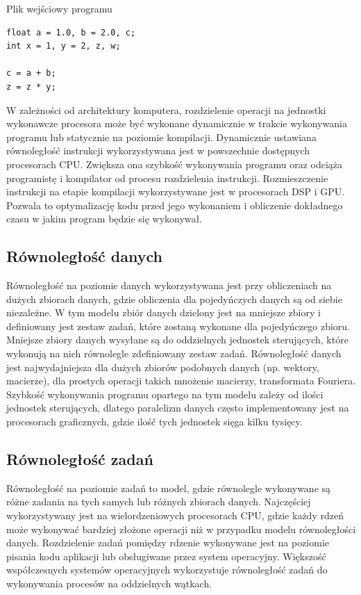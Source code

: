 \begin{program}
\caption{Plik wejściowy programu}
\begin{lstlisting}
float a = 1.0, b = 2.0, c;
int x = 1, y = 2, z, w;

c = a + b;
z = z * y;
\end{lstlisting}
\end{program}

W zależności od architektury komputera, rozdzielenie operacji na jednostki wykonawcze procesora może być wykonane dynamicznie w trakcie wykonywania programu lub statycznie na poziomie kompilacji. Dynamicznie ustawiana równoległość instrukcji wykorzystywana jest w powszechnie dostępnych procesorach CPU. Zwiększa ona szybkość wykonywania programu oraz odciąża programistę i kompilator od procesu rozdzielenia instrukcji. Rozmieszczenie instrukcji na etapie kompilacji wykorzystywane jest w procesorach DSP i GPU. Pozwala to optymalizację kodu przed jego wykonaniem i obliczenie dokładnego czasu w jakim program będzie się wykonywał.  

\subsection{Równoległość danych}\label{sec:datap}

Równoległość na poziomie danych wykorzystywana jest przy obliczeniach na dużych zbiorach danych, gdzie obliczenia dla pojedyńczych danych są od siebie niezależne. W tym modelu zbiór danych dzielony jest na mniejsze zbiory i definiowany jest zestaw zadań, które zostaną wykonane dla pojedyńczego zbioru. Mniejsze zbiory danych wysyłane są do oddzielnych jednostek sterujących, które wykonują na nich równolegle zdefiniowany zestaw zadań. Równoległość danych jest najwydajniejsza dla dużych zbiorów podobnych danych (np. wektory, macierze), dla prostych operacji takich mnożenie macierzy, transformata Fouriera. Szybkość wykonywania programu opartego na tym modelu zależy od ilości jednostek sterujących, dlatego paralelizm danych często implementowany jest na procesorach graficznych, gdzie ilość tych jednostek sięga kilku tysięcy.

\subsection{Równoległość zadań}\label{sec:taskp}

Równoległość na poziomie zadań to model, gdzie równolegle wykonywane są różne zadania na tych samych lub różnych zbiorach danych. Najczęściej wykorzystywany jest na wielordzeniowych procesorach CPU, gdzie każdy rdzeń może wykonywać bardziej złożone operacji niż w przypadku modelu równoległości danych. Rozdzielenie zadań pomiędzy rdzenie wykonywane jest na poziomie pisania kodu aplikacji lub obsługiwane przez system operacyjny. Większość współczesnych systemów operacyjnych wykorzystuje równoległość zadań do wykonywania procesów na oddzielnych wątkach.

